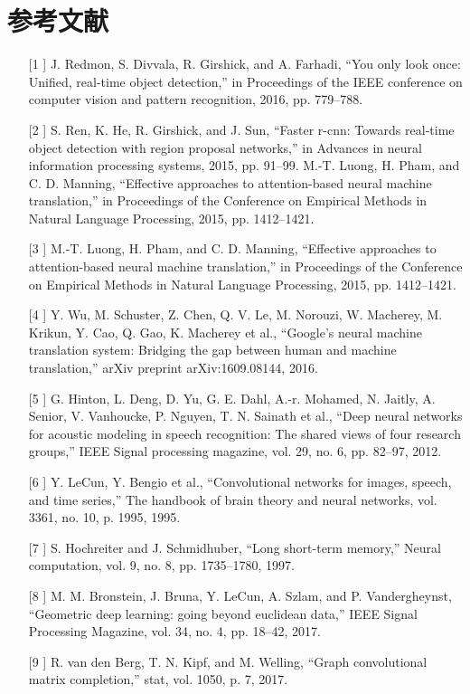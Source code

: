 \documentclass[UTF8]{ctexart}
\begin{document}
\section{参考文献}
\begin{itemize}
\item [[1]] 
J. Redmon, S. Divvala, R. Girshick, and A. Farhadi, “You only
look once: Unified, real-time object detection,” in Proceedings of
the IEEE conference on computer vision and pattern recognition, 2016,
pp. 779–788.
\item [[2]] 
S. Ren, K. He, R. Girshick, and J. Sun, “Faster r-cnn: Towards
real-time object detection with region proposal networks,” in
Advances in neural information processing systems, 2015, pp. 91–99.
M.-T. Luong, H. Pham, and C. D. Manning, “Effective approaches
to attention-based neural machine translation,” in Proceedings of
the Conference on Empirical Methods in Natural Language Processing,
2015, pp. 1412–1421.
\item [[3]] 
M.-T. Luong, H. Pham, and C. D. Manning, “Effective approaches
to attention-based neural machine translation,” in Proceedings of
the Conference on Empirical Methods in Natural Language Processing,
2015, pp. 1412–1421.
\item [[4]]
Y. Wu, M. Schuster, Z. Chen, Q. V. Le, M. Norouzi, W. Macherey,
M. Krikun, Y. Cao, Q. Gao, K. Macherey et al., “Google’s neural
machine translation system: Bridging the gap between human
and machine translation,” arXiv preprint arXiv:1609.08144, 2016.
\item [[5]]
G. Hinton, L. Deng, D. Yu, G. E. Dahl, A.-r. Mohamed, N. Jaitly,
A. Senior, V. Vanhoucke, P. Nguyen, T. N. Sainath et al., “Deep
neural networks for acoustic modeling in speech recognition:
The shared views of four research groups,” IEEE Signal processing
magazine, vol. 29, no. 6, pp. 82–97, 2012.
\item [[6]]
Y. LeCun, Y. Bengio et al., “Convolutional networks for images,
speech, and time series,” The handbook of brain theory and neural
networks, vol. 3361, no. 10, p. 1995, 1995.
\item [[7]]
S. Hochreiter and J. Schmidhuber, “Long short-term memory,”
Neural computation, vol. 9, no. 8, pp. 1735–1780, 1997.
\item [[8]]
M. M. Bronstein, J. Bruna, Y. LeCun, A. Szlam, and P. Vandergheynst, “Geometric deep learning: going beyond euclidean
data,” IEEE Signal Processing Magazine, vol. 34, no. 4, pp. 18–42,
2017.
\item [[9]]
R. van den Berg, T. N. Kipf, and M. Welling, “Graph convolutional matrix completion,” stat, vol. 1050, p. 7, 2017.

\end{itemize}
\end{document}
